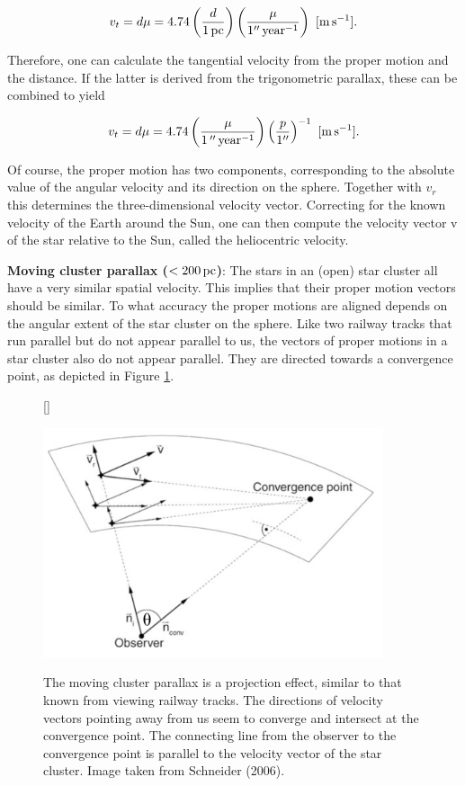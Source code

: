 \documentclass[a4paper,11pt]{article}
\begin{document}
\begin{align*}
    v_t = d\mu = 4.74\left(\frac{d}{1\,{\rm pc}}\right) \left(\frac{\mu}{1''\,{\rm year^{-1}}}\right) ~ [{\rm m\,s^{-1}}].
\end{align*}

{\noindent}Therefore, one can calculate the tangential velocity from the proper motion and the distance. If the latter is derived from the trigonometric parallax, these can be combined to yield

\begin{align*}
    v_t = d\mu = 4.74 \left(\frac{\mu}{1\,''\,{\rm year^{-1}}}\right) \left(\frac{p}{1''}\right)^{-1} ~ [{\rm m\,s^{-1}}].
\end{align*}

{\noindent}Of course, the proper motion has two components, corresponding to the absolute value of the angular velocity and its direction on the sphere. Together with $v_r$ this determines the three-dimensional velocity vector. Correcting for the known velocity of the Earth around the Sun, one can then compute the velocity vector v of the star relative to the Sun, called the heliocentric velocity.

{\noindent}\textbf{Moving cluster parallax ($<200\,{\rm pc}$)}: The stars in an (open) star cluster all have a very similar spatial velocity. This implies that their proper motion vectors should be similar. To what accuracy the proper motions are aligned depends on the angular extent of the star cluster on the sphere. Like two railway tracks that run parallel but do not appear parallel to us, the vectors of proper motions in a star cluster also do not appear parallel. They are directed towards a convergence point, as depicted in Figure \ref{fig:clusterparallax}.

\begin{figure}[h]
    [\FBwidth]
    {\caption{\footnotesize{The moving cluster parallax is a projection effect, similar to that known from viewing railway tracks. The directions of velocity vectors pointing away from us seem to converge and intersect at the convergence point. The connecting line from the observer to the convergence point is parallel to the velocity vector of the star cluster. Image taken from Schneider (2006).}}
    \label{fig:clusterparallax}}
    {\includegraphics[width=10cm]{figures/ClusterParallax.png}}
\end{figure}
\end{document}
